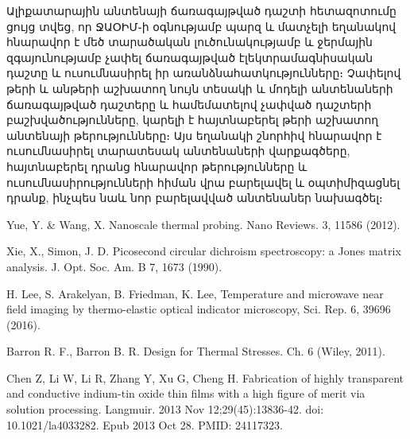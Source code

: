 \documentclass[12pt, fleqn]{report}
\begin{document}
Ալիքատարային անտենայի ճառագայթված դաշտի հետազոտումը ցույց տվեց, որ ՋԱՕԻՄ֊ի օգնությամբ պարզ և մատչելի եղանակով հնարավոր է մեծ տարածական լուծունակությամբ և ջերմային զգայունությամբ չափել ճառագայթված էլեկտրամագնիսական դաշտը և ուսումնասիրել իր առանձնահատկությունները։ Չափելով թերի և անթերի աշխատող նույն տեսակի և մոդելի անտենաների ճառագայթված դաշտերը և համեմատելով չափված դաշտերի բաշխվածությունները, կարելի է հայտնաբերել թերի աշխատող անտենայի թերությունները։ Այս եղանակի շնորհիվ հնարավոր է ուսումնասիրել տարատեսակ անտենաների վարքագծերը, հայտնաբերել դրանց հնարավոր թերությունները և ուսումնասիրությունների հիման վրա բարելավել և օպտիմիզացնել դրանք, ինչպես նաև նոր բարելավված անտենաներ նախագծել։

\renewcommand{\bibname}{Գրականություն}
\begin{thebibliography}{9}

Yue, Y. \& Wang, X. Nanoscale thermal probing. Nano Reviews. 3, 11586 (2012).

Xie, X., Simon, J. D. Picosecond circular dichroism spectroscopy: a Jones matrix
analysis. J. Opt. Soc. Am. B 7, 1673 (1990).

H. Lee, S. Arakelyan, B. Friedman, K. Lee, Temperature and microwave near field imaging by thermo-elastic optical indicator microscopy, Sci. Rep. 6, 39696 (2016).

 Barron R. F., Barron B. R. Design for Thermal Stresses. Ch. 6 (Wiley, 2011).

 Chen Z, Li W, Li R, Zhang Y, Xu G, Cheng H. Fabrication of highly transparent and conductive indium-tin oxide thin films with a high figure of merit via solution processing. Langmuir. 2013 Nov 12;29(45):13836-42. doi: 10.1021/la4033282. Epub 2013 Oct 28. PMID: 24117323.
\end{thebibliography}


   
\end{document}
